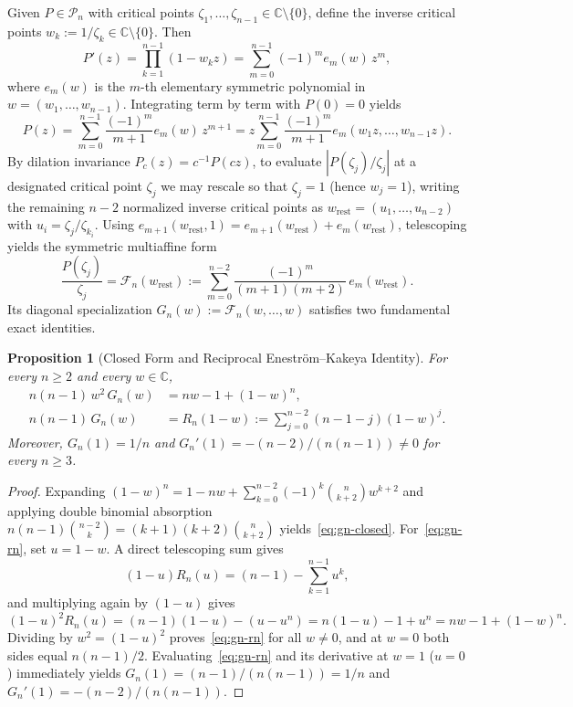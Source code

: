 \documentclass[11pt,a4paper]{article}
\newtheorem{proposition}[theorem]{Proposition}
\theoremstyle{definition}
\theoremstyle{remark}
\newcommand{\CC}{\mathbb{C}}
\begin{document}
Given $P \in \mathcal{P}_n$ with critical points $\zeta_1, \dots, \zeta_{n-1} \in \CC \setminus \{0\}$, define the inverse critical points $w_k := 1/\zeta_k \in \CC \setminus \{0\}$. Then
\[
P'(z) = \prod_{k=1}^{n-1} (1 - w_k z) = \sum_{m=0}^{n-1} (-1)^m e_m(w)\, z^m,
\]
where $e_m(w)$ is the $m$-th elementary symmetric polynomial in $w = (w_1, \dots, w_{n-1})$. Integrating term by term with $P(0) = 0$ yields
\begin{equation}
\label{eq:poly-inv}
P(z) = \sum_{m=0}^{n-1} \frac{(-1)^m}{m+1} e_m(w)\, z^{m+1} = z \sum_{m=0}^{n-1} \frac{(-1)^m}{m+1} e_m(w_1 z, \dots, w_{n-1} z).
\end{equation}
By dilation invariance $P_c(z) = c^{-1} P(cz)$, to evaluate $|P(\zeta_j)/\zeta_j|$ at a designated critical point $\zeta_j$ we may rescale so that $\zeta_j = 1$ (hence $w_j = 1$), writing the remaining $n - 2$ normalized inverse critical points as $w_{\mathrm{rest}} = (u_1, \dots, u_{n-2})$ with $u_i = \zeta_j / \zeta_{k_i}$. Using $e_{m+1}(w_{\mathrm{rest}}, 1) = e_{m+1}(w_{\mathrm{rest}}) + e_m(w_{\mathrm{rest}})$, telescoping yields the symmetric multiaffine form
\begin{equation}
\label{eq:p1form}
\frac{P(\zeta_j)}{\zeta_j} = \mathcal{F}_n(w_{\mathrm{rest}}) := \sum_{m=0}^{n-2} \frac{(-1)^m}{(m+1)(m+2)}\, e_m(w_{\mathrm{rest}}).
\end{equation}
Its diagonal specialization $G_n(w) := \mathcal{F}_n(w, \dots, w)$ satisfies two fundamental exact identities.

\begin{proposition}[Closed Form and Reciprocal Enestr\"om--Kakeya Identity]
\label{prop:gn-identities}
For every $n \ge 2$ and every $w \in \CC$,
\begin{align}
n(n-1)\, w^2\, G_n(w) &= n w - 1 + (1 - w)^n, \label{eq:gn-closed} \\
n(n-1)\, G_n(w) &= R_n(1 - w) := \sum_{j=0}^{n-2} (n - 1 - j)(1 - w)^j. \label{eq:gn-rn}
\end{align}
Moreover, $G_n(1) = 1/n$ and $G_n'(1) = -(n-2)/(n(n-1)) \neq 0$ for every $n \ge 3$.
\end{proposition}

\begin{proof}
Expanding $(1 - w)^n = 1 - nw + \sum_{k=0}^{n-2} (-1)^k \binom{n}{k+2} w^{k+2}$ and applying double binomial absorption $n(n-1)\binom{n-2}{k} = (k+1)(k+2)\binom{n}{k+2}$ yields~\eqref{eq:gn-closed}.
For~\eqref{eq:gn-rn}, set $u = 1 - w$. A direct telescoping sum gives
\begin{equation}
\label{eq:rn-tel1}
(1 - u) R_n(u) = (n - 1) - \sum_{k=1}^{n-1} u^k,
\end{equation}
and multiplying again by $(1 - u)$ gives
\[
(1 - u)^2 R_n(u) = (n - 1)(1 - u) - (u - u^n) = n(1 - u) - 1 + u^n = nw - 1 + (1 - w)^n.
\]
Dividing by $w^2 = (1 - u)^2$ proves~\eqref{eq:gn-rn} for all $w \neq 0$, and at $w = 0$ both sides equal $n(n-1)/2$. Evaluating~\eqref{eq:gn-rn} and its derivative at $w = 1$ ($u = 0$) immediately yields $G_n(1) = (n-1)/(n(n-1)) = 1/n$ and $G_n'(1) = -(n-2)/(n(n-1))$.
\end{proof}
\end{document}
